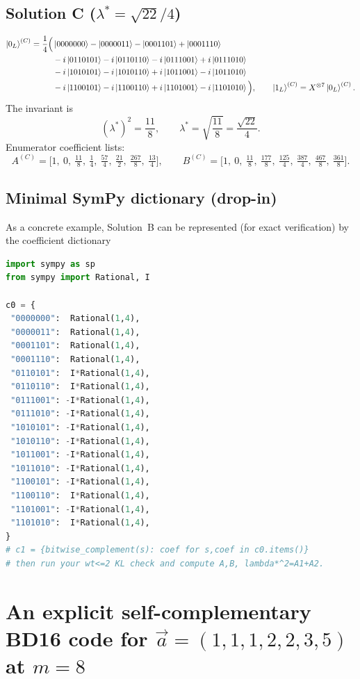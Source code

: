\documentclass[11pt]{article}
\begin{document}
\subsection{Solution C (\texorpdfstring{$\lambda^\ast=\sqrt{22}/4$}{lambda*=sqrt(22)/4})}
\[
\begin{aligned}
\ket{0_L}^{(C)}=\frac{1}{4}\Big(
&\ket{0000000}-\ket{0000011}-\ket{0001101}+\ket{0001110}\\
&-i\ket{0110101}-i\ket{0110110}-i\ket{0111001}+i\ket{0111010}\\
&-i\ket{1010101}-i\ket{1010110}+i\ket{1011001}-i\ket{1011010}\\
&-i\ket{1100101}-i\ket{1100110}+i\ket{1101001}-i\ket{1101010}
\Big),
\qquad
\ket{1_L}^{(C)}=X^{\otimes 7}\ket{0_L}^{(C)}.
\end{aligned}
\]
The invariant is
\[
(\lambda^\ast)^2=\frac{11}{8},\qquad \lambda^\ast=\sqrt{\frac{11}{8}}=\frac{\sqrt{22}}{4}.
\]
Enumerator coefficient lists:
\[
A^{(C)}=\Big[1,\ 0,\ \tfrac{11}{8},\ \tfrac14,\ \tfrac{57}{4},\ \tfrac{21}{2},\ \tfrac{267}{8},\ \tfrac{13}{4}\Big],
\qquad
B^{(C)}=\Big[1,\ 0,\ \tfrac{11}{8},\ \tfrac{177}{8},\ \tfrac{125}{4},\ \tfrac{387}{4},\ \tfrac{467}{8},\ \tfrac{361}{8}\Big].
\]

\subsection{Minimal SymPy dictionary (drop-in)}
As a concrete example, Solution~B can be represented (for exact verification) by the coefficient dictionary
\begin{lstlisting}[language=Python]
import sympy as sp
from sympy import Rational, I

c0 = {
 "0000000":  Rational(1,4),
 "0000011":  Rational(1,4),
 "0001101":  Rational(1,4),
 "0001110":  Rational(1,4),
 "0110101":  I*Rational(1,4),
 "0110110":  I*Rational(1,4),
 "0111001": -I*Rational(1,4),
 "0111010": -I*Rational(1,4),
 "1010101": -I*Rational(1,4),
 "1010110": -I*Rational(1,4),
 "1011001": -I*Rational(1,4),
 "1011010": -I*Rational(1,4),
 "1100101": -I*Rational(1,4),
 "1100110":  I*Rational(1,4),
 "1101001": -I*Rational(1,4),
 "1101010":  I*Rational(1,4),
}
# c1 = {bitwise_complement(s): coef for s,coef in c0.items()}
# then run your wt<=2 KL check and compute A,B, lambda*^2=A1+A2.
\end{lstlisting}

\section{An explicit self-complementary BD16 code for \texorpdfstring{$\vec a=(1,1,1,2,2,3,5)$}{a=(1,1,1,2,2,3,5)} at \texorpdfstring{$m=8$}{m=8}}
\end{document}

